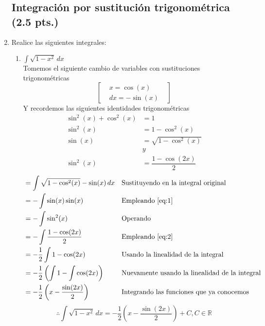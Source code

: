 \documentclass[letterpaper]{article}
\newcommand{\R}{\mathds{R}}
\renewcommand{\*}{\cdot}
\theoremstyle{definition}
\begin{document}
\begin{enumerate}
\subsection*{Integración por sustitución trigonométrica (2.5 pts.)}
\item  Realice las siguientes integrales:
\begin{enumerate}
\item$\displaystyle \int \sqrt{1 - x^2} \, dx$\\
Tomemos el siguiente cambio de variables con sustituciones trigonométricas
\[  \begin{bmatrix}
& x = \cos(x) &\\
&dx = -\sin(x)&
\end{bmatrix} \]
Y recordemos las siguientes identidades trigonométricas
\begin{align*}
	\sin^2(x) + \cos^2(x) &= 1\\
	\sin^2(x) &= 1 - \cos^2(x)\\
	\sin(x) &= \sqrt{1 - \cos^2(x)} \tag{$\alpha$}\label{eq:1} \\ &y  \\
	\sin^2(x) &= \dfrac{1 - \cos(2x)}{2} \tag{$\beta$}\label{eq:2}
\end{align*}
\begin{align*}
	&= \int \sqrt{1 - \cos^2(x)} - \sin(x)\,dx &&\text{Sustituyendo en la integral original}\\
	&= -\int \sin(x)\sin(x) &&\text{Empleando \ref{eq:1}}\\
	&= -\int \sin^2(x) &&\text{Operando}\\
	&= -\int \dfrac{1 - \cos(2x)}{2} &&\text{Empleando \ref{eq:2}}\\
	&= -\dfrac{1}{2}\int 1 - \cos(2x) &&\text{Usando la linealidad de la integral}\\
	&= -\dfrac{1}{2} \left(\int 1 - \int\cos(2x)\right) &&\text{Nuevamente usando la linealidad de la integral}\\
	&= -\dfrac{1}{2} \left(x - \dfrac{\sin(2x)}{2}\right) &&\text{Integrando las funciones que ya conocemos}\\
\end{align*}
\[ \therefore \int \sqrt{1 - x^2} \, dx = -\dfrac{1}{2} \left(x - \dfrac{\sin(2x)}{2}\right) + C, C \in \R \]



\end{enumerate}
\end{enumerate}
\end{document}
